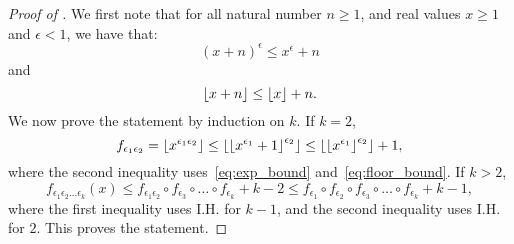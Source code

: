     \begin{proof}[Proof of ]
        We first note that for all natural number $n \geq 1$, and real values $x \geq 1$ and $\epsilon < 1$,
        we have that:
        \begin{equation} \label{eq:exp_bound}
            (x+n)^{\epsilon} \leq x^{\epsilon} + n
        \end{equation}
        and
        \begin{equation} \label{eq:floor_bound}
            \left\lfloor x+n \right\rfloor \leq \left\lfloor x \right\rfloor + n.
        \end{equation}
        We now prove the statement by induction on $k$.
        If $k=2$,
        \[
            f_{\epsilon_1 \epsilon_2} = \left\lfloor x^{\epsilon_1 \epsilon_2} \right\rfloor
                \leq \left\lfloor \left\lfloor x^{\epsilon_1}+1 \right\rfloor^{\epsilon_2} \right\rfloor
                \leq \left\lfloor \left\lfloor x^{\epsilon_1} \right\rfloor^{\epsilon_2} \right\rfloor + 1,
        \]
        where the second inequality uses~\eqref{eq:exp_bound} and~\eqref{eq:floor_bound}.
        If $k > 2$,
        \[
            f_{\epsilon_1 \epsilon_2 \dots \epsilon_k} (x)
                \leq f_{\epsilon_1 \epsilon_2} \circ f_{\epsilon_3} \circ \dots \circ f_{\epsilon_{k}} + k - 2
                \leq f_{\epsilon_1} \circ f_{\epsilon_2} \circ f_{\epsilon_3} \circ \dots \circ f_{\epsilon_{k}} + k - 1,
        \]
        where the first inequality uses I.H. for $k-1$, and the second inequality uses I.H. for $2$.
        This proves the statement.
    \end{proof}

